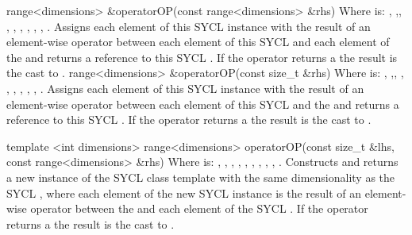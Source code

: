   \addRow
    { range<dimensions> \&operatorOP(const range<dimensions> \&rhs) }
    {
      Where  is: \codeinline{+=}, \codeinline{-=},\codeinline{
      *=}, \codeinline{/=}, \codeinline{\%=}, \codeinline{<<=}, \codeinline{
      >>=}, \codeinline{\&=}, \codeinline{|=}, \codeinline{^=}.
      \newline
      Assigns each element of this SYCL  instance with the
      result of an element-wise  operator between each element
      of this SYCL  and each element of the 
       and returns a reference to this SYCL . If the operator returns a  the result is the cast
      to .
    }
  \addRow
    { range<dimensions> \&operatorOP(const size_t \&rhs) }
    {
      Where  is: \codeinline{+=}, \codeinline{-=},\codeinline{
      *=}, \codeinline{/=}, \codeinline{\%=}, \codeinline{<<=}, \codeinline{
      >>=}, \codeinline{\&=}, \codeinline{|=}, \codeinline{^=}.
      \newline
      Assigns each element of this SYCL  instance with the
      result of an element-wise  operator between each element
      of this SYCL  and the   and returns a reference to this SYCL . If the
      operator returns a  the result is the cast to
      .
    }
\completeTable

  \addRowThreeL
    { template <int dimensions> }
    { range<dimensions> operatorOP(const size_t \&lhs, }
    { const range<dimensions> \&rhs) }
    {
      Where  is: \codeinline{+}, \codeinline{-}, \codeinline{*},
      \codeinline{/}, \codeinline{\%}, \codeinline{<<}, \codeinline{>>},
      \codeinline{\&}, \codeinline{|}, \codeinline{^}.
      \newline
      Constructs and returns a new instance of the SYCL  class
      template with the same dimensionality as the  SYCL
      , where each element of the new SYCL 
      instance is the result of an element-wise  operator between
      the   and each element of the
       SYCL . If the operator returns a
       the result is the cast to .
    }
\completeTable


